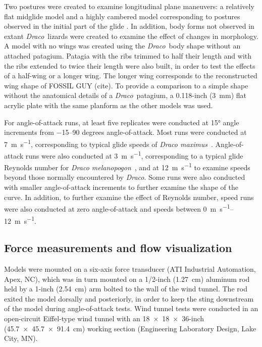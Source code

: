 \documentclass[10pt]{article}
\newcommand{\Draco}{\emph{Draco}}
\newcommand{\Dracomelanopogon}{\emph{Draco melanopogon}}
\newcommand{\Dracomaximus}{\emph{Draco maximus}}
\begin{document}
Two postures were created to examine longitudinal plane maneuvers: a relatively flat midglide model and a highly cambered model corresponding to postures observed in the initial part of the glide \citep{McGuire:2003}.  In addition, body forms not observed in extant \Draco\ lizards were created to examine the effect of changes in morphology.  A model with no wings was created using the \Draco\ body shape without an attached patagium.  Patagia with the ribs trimmed to half their length and with the ribs extended to twice their length were also built, in order to test the effects of a half-wing or a longer wing.  The longer wing corresponds to the reconstructed wing shape of FOSSIL GUY (cite).  To provide a comparison to a simple shape without the anatomical details of a \Draco\ patagium, a \num{0.118}-inch (\SI{3}{\milli\meter}) flat acrylic plate with the same planform as the other models was used.  

For angle-of-attack runs, at least five replicates were conducted at \ang{15} angle increments from \numrange{-15}{90} degrees angle-of-attack.  Most runs were conducted at \SI{7}{\meter\per\second}, corresponding to typical glide speeds of \Dracomaximus\ \citep{McGuire:2005}. Angle-of-attack runs were also conducted at \SI{3}{\meter\per\second}, corresponding to a typical glide Reynolds number for \Dracomelanopogon\ \citep{McGuire:2005}, and at \SI{12}{\meter\per\second} to examine speeds beyond those normally encountered by \Draco.  Some runs were also conducted with smaller angle-of-attack increments to further examine the shape of the curve.  In addition, to further examine the effect of Reynolds number, speed runs were also conducted at zero angle-of-attack and speeds between \SIrange{0}{12}{\meter\per\second}.   

\subsection{Force measurements and flow visualization}
Models were mounted on a six-axis force transducer (ATI Industrial Automation, Apex, NC), which was in turn mounted on a 1/2-inch (\SI{1.27}{\centi\meter}) aluminum rod held by a 1-inch (\SI{2.54}{\centi\meter}) arm bolted to the wall of the wind tunnel.  The rod exited the model dorsally and posteriorly, in order to keep the sting downstream of the model during angle-of-attack tests.  Wind tunnel tests were conducted in an open-circuit Eiffel-type wind tunnel with an \num{18 x 18 x 36}-inch (\SI{45.7 x 45.7 x 91.4}{\centi\meter}) working section (Engineering Laboratory Design, Lake City, MN).  
\end{document}
